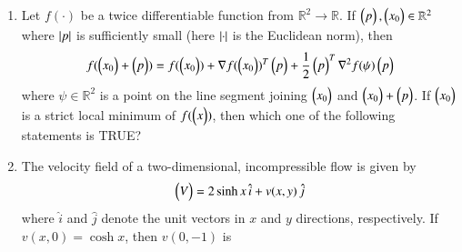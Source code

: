 \documentclass[journal]{IEEEtran}
\begin{document}
\begin{enumerate}[leftmargin=0pt]
\vspace{2mm}

\begin{enumerate}
\end{enumerate}

\hfill{}

\vspace{4mm}

\item
Let $f(\cdot)$ be a twice differentiable function from $\mathbb{R}^2 \to \mathbb{R}$. If $\begin{pmatrix}p\end{pmatrix}, \begin{pmatrix}x_0\end{pmatrix} \in \mathbb{R}^2$ where $\left\vert p\right\vert$ is sufficiently small (here $\left\vert\cdot\right\vert$ is the Euclidean norm), then
\[
f(\begin{pmatrix}x_0\end{pmatrix} + \begin{pmatrix}p\end{pmatrix}) = f(\begin{pmatrix}x_0\end{pmatrix}) + \nabla f(\begin{pmatrix}x_0\end{pmatrix})^T \begin{pmatrix}p\end{pmatrix} + \frac{1}{2} \begin{pmatrix}p\end{pmatrix}^T \nabla^2 f(\psi) \begin{pmatrix}p\end{pmatrix}
\]
where $\psi \in \mathbb{R}^2$ is a point on the line segment joining $\begin{pmatrix}x_0\end{pmatrix}$ and $\begin{pmatrix}x_0\end{pmatrix} + \begin{pmatrix}p\end{pmatrix}$. If $\begin{pmatrix}x_0\end{pmatrix}$ is a strict local minimum of $f(\begin{pmatrix}x\end{pmatrix})$, then which one of the following statements is TRUE?

\vspace{2mm}

\begin{enumerate}
\end{enumerate}

\hfill{}

\vspace{4mm}

\item
The velocity field of a two-dimensional, incompressible flow is given by
\[
\begin{pmatrix}V\end{pmatrix} = 2 \sinh x \, \hat{i} + v(x,y) \, \hat{j}
\]
where $\hat{i}$ and $\hat{j}$ denote the unit vectors in $x$ and $y$ directions, respectively. If $v(x,0) = \cosh x$, then $v(0,-1)$ is


\end{enumerate}
\end{document}
